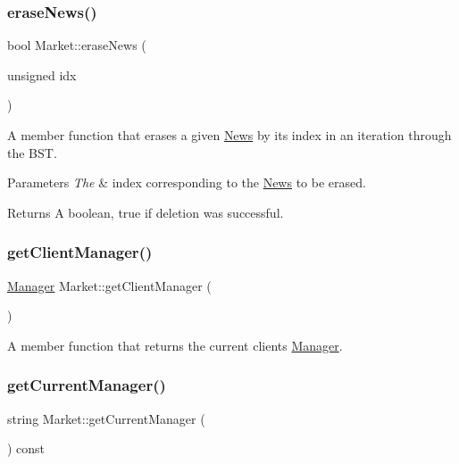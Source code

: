 \subsubsection{\texorpdfstring{erase\+News()}{eraseNews()}}
{\footnotesize\ttfamily bool Market\+::erase\+News (\begin{DoxyParamCaption}\item[{unsigned}]{idx }\end{DoxyParamCaption})}

A member function that erases a given \hyperlink{class_news}{News} by its index in an iteration through the B\+ST. 
\begin{DoxyParams}{Parameters}
{\em The} & index corresponding to the \hyperlink{class_news}{News} to be erased. \\
\hline
\end{DoxyParams}
\begin{DoxyReturn}{Returns}
A boolean, true if deletion was successful. 
\end{DoxyReturn}
\hypertarget{class_market_a9a1890b1cbe63050690562427a3c7a0d}{}\label{class_market_a9a1890b1cbe63050690562427a3c7a0d} 
\subsubsection{\texorpdfstring{get\+Client\+Manager()}{getClientManager()}}
{\footnotesize\ttfamily \hyperlink{class_manager}{Manager} Market\+::get\+Client\+Manager (\begin{DoxyParamCaption}{ }\end{DoxyParamCaption})}

A member function that returns the current client\textquotesingle{}s \hyperlink{class_manager}{Manager}. \hypertarget{class_market_ad64fc7b35bb0b060345ff1bd0fbe2f51}{}\label{class_market_ad64fc7b35bb0b060345ff1bd0fbe2f51} 
\subsubsection{\texorpdfstring{get\+Current\+Manager()}{getCurrentManager()}}
{\footnotesize\ttfamily string Market\+::get\+Current\+Manager (\begin{DoxyParamCaption}{ }\end{DoxyParamCaption}) const}

